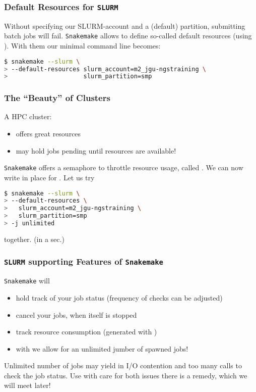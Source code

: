 \begin{frame}[fragile]
  \frametitle{Default Resources for \texttt{SLURM}}
  Without specifying our SLURM-account and a (default) partition, submitting batch jobs will fail. \texttt{Snakemake} allows to define so-called default resources (using ). With them our minimal command line becomes:
  \begin{lstlisting}[language=Bash, style=Shell, basicstyle=\footnotesize]
$ snakemake --slurm \
> --default-resources slurm_account=m2_jgu-ngstraining \
>                     slurm_partition=smp
  \end{lstlisting}
\end{frame}

\begin{frame}[fragile]
  \frametitle{The ``Beauty'' of Clusters}
  A HPC cluster:
  \begin{itemize}
   \item offers great resources
   \item may hold jobs pending until resources are available!
  \end{itemize}
  \pause
  \texttt{Snakemake} offers a semaphore to throttle resource usage, called . We can now write  in place for . Let us try
  \begin{lstlisting}[language=Bash, style=Shell, basicstyle=\footnotesize]
$ snakemake --slurm \
> --default-resources \ 
>   slurm_account=m2_jgu-ngstraining \
>   slurm_partition=smp
> -j unlimited
  \end{lstlisting}
  together. (in a sec.)
\end{frame}

\begin{frame}[fragile]
  \frametitle{\texttt{SLURM} supporting Features of \texttt{Snakemake}}
  \texttt{Snakemake} will
  \begin{itemize}[<+->]
   \item hold track of your job status (frequency of checks can be adjusted)
   \item cancel your jobs, when itself is stopped
   \item track resource consumption (generated with )
   \item with  we allow for an unlimited jumber of spawned jobs!
  \end{itemize}
  \pause
  \begin{warning}
  	Unlimited number of jobs may yield in I/O contention and too many calls to check the job status. Use with care for both issues there is a remedy, which we will meet later!
  \end{warning}
\end{frame}

